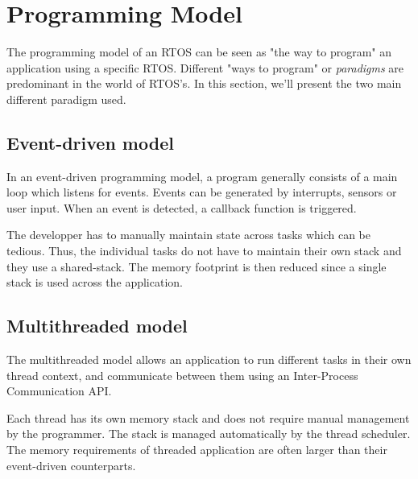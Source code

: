 \section{Programming Model}
The programming model of an RTOS can be seen as "the way to program" an application using a specific RTOS.
Different "ways to program" or \textit{paradigms} are predominant in the world of RTOS's.
In this section, we'll present the two main different paradigm used.


\subsection{Event-driven model}
In an event-driven programming model, a program generally consists of a main loop which listens for events.
Events can be generated by interrupts, sensors or user input.
When an event is detected, a callback function is triggered.

The developper has to manually maintain state across tasks which can be tedious.
Thus, the individual tasks do not have to maintain their own stack and they use a shared-stack.
The memory footprint is then reduced since a single stack is used across the application.

\subsection{Multithreaded model}
The multithreaded model allows an application to run different tasks in their own thread context,
    and communicate between them using an Inter-Process Communication API.

Each thread has its own memory stack and does not require manual management by the programmer.
The stack is managed automatically by the thread scheduler.
The memory requirements of threaded application are often larger than their event-driven counterparts.